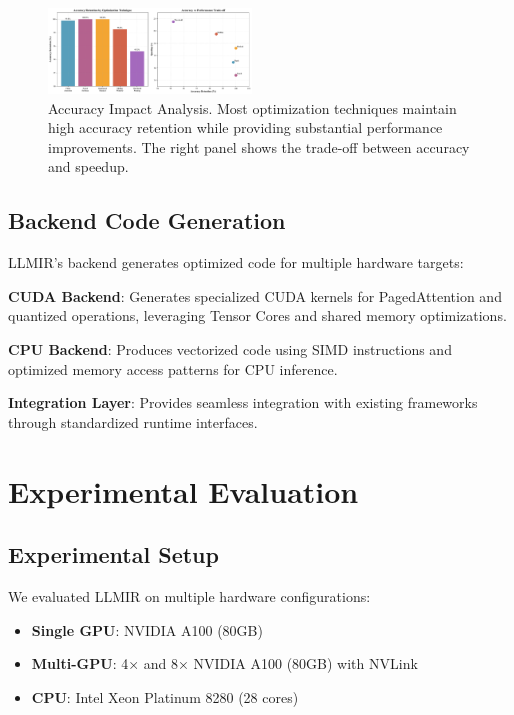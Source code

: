 \documentclass[conference]{IEEEtran}
\begin{document}
\begin{figure}[htbp]
\centering
\includegraphics[width=0.48\textwidth]{figures/attention_accuracy_impact.pdf}
\caption{Accuracy Impact Analysis. Most optimization techniques maintain high accuracy retention while providing substantial performance improvements. The right panel shows the trade-off between accuracy and speedup.}
\label{fig:accuracy_impact}
\end{figure}

\subsection{Backend Code Generation}

LLMIR's backend generates optimized code for multiple hardware targets:

\textbf{CUDA Backend}: Generates specialized CUDA kernels for PagedAttention and quantized operations, leveraging Tensor Cores and shared memory optimizations.

\textbf{CPU Backend}: Produces vectorized code using SIMD instructions and optimized memory access patterns for CPU inference.

\textbf{Integration Layer}: Provides seamless integration with existing frameworks through standardized runtime interfaces.

\section{Experimental Evaluation}

\subsection{Experimental Setup}

We evaluated LLMIR on multiple hardware configurations:
\begin{itemize}
    \item \textbf{Single GPU}: NVIDIA A100 (80GB)
    \item \textbf{Multi-GPU}: 4× and 8× NVIDIA A100 (80GB) with NVLink
    \item \textbf{CPU}: Intel Xeon Platinum 8280 (28 cores)
\end{itemize}
\end{document}
